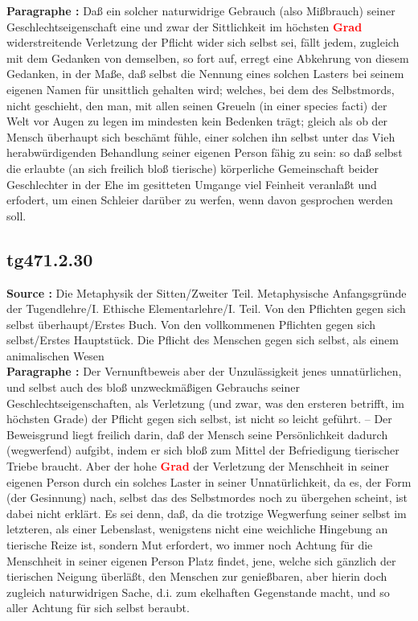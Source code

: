\documentclass[a4paper,12pt,twoside]{book}
\newcommand{\match}[1]{\textcolor{red}{\textbf{#1}}}
\begin{document}
	\textbf{Paragraphe : }Daß ein solcher naturwidrige Gebrauch (also Mißbrauch) seiner Geschlechtseigenschaft eine und zwar der Sittlichkeit im höchsten \match{Grad} widerstreitende Verletzung der Pflicht wider sich selbst sei, fällt jedem, zugleich mit dem Gedanken von demselben, so fort auf, erregt eine Abkehrung von diesem Gedanken, in der Maße, daß selbst die Nennung  eines solchen Lasters bei seinem eigenen Namen für unsittlich gehalten wird; welches, bei dem des Selbstmords, nicht geschieht, den man, mit allen seinen Greueln (in einer species facti) der Welt vor Augen zu legen im mindesten kein Bedenken trägt; gleich als ob der Mensch überhaupt sich beschämt fühle, einer solchen ihn selbst unter das Vieh herabwürdigenden Behandlung seiner eigenen Person fähig zu sein: so daß selbst die erlaubte (an sich freilich bloß tierische) körperliche Gemeinschaft beider Geschlechter in der Ehe im gesitteten Umgange viel Feinheit veranlaßt und erfodert, um einen Schleier darüber zu werfen, wenn davon gesprochen werden soll. 
	
	\subsection*{tg471.2.30} 
	\textbf{Source : }Die Metaphysik der Sitten/Zweiter Teil. Metaphysische Anfangsgründe der Tugendlehre/I. Ethische Elementarlehre/I. Teil. Von den Pflichten gegen sich selbst überhaupt/Erstes Buch. Von den vollkommenen Pflichten gegen sich selbst/Erstes Hauptstück. Die Pflicht des Menschen gegen sich selbst, als einem animalischen Wesen\\  
	
	\textbf{Paragraphe : }Der Vernunftbeweis aber der Unzulässigkeit jenes unnatürlichen, und selbst auch des bloß unzweckmäßigen Gebrauchs seiner Geschlechtseigenschaften, als Verletzung (und zwar, was den ersteren betrifft, im höchsten Grade) der Pflicht gegen sich selbst, ist nicht so leicht geführt. – Der Beweisgrund liegt freilich darin, daß der Mensch seine Persönlichkeit dadurch (wegwerfend) aufgibt, indem er sich bloß zum Mittel der Befriedigung tierischer Triebe braucht. Aber der hohe \match{Grad} der Verletzung der Menschheit in seiner eigenen Person durch ein solches Laster in seiner Unnatürlichkeit, da es, der Form (der Gesinnung) nach, selbst das des Selbstmordes noch zu übergehen scheint, ist dabei nicht erklärt. Es sei denn, daß, da die trotzige Wegwerfung seiner selbst im letzteren, als einer Lebenslast, wenigstens nicht eine weichliche Hingebung an tierische Reize ist, sondern Mut erfordert, wo immer noch Achtung für die Menschheit in seiner eigenen Person Platz findet, jene, welche sich gänzlich der tierischen Neigung überläßt, den Menschen zur genießbaren, aber hierin doch zugleich naturwidrigen Sache, d.i. zum ekelhaften Gegenstande macht, und so aller Achtung für sich selbst beraubt. 
	
\end{document}

